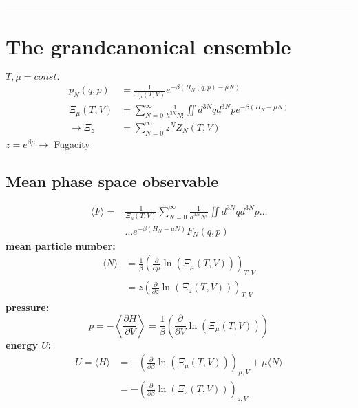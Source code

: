 \noindent\rule[1ex]{\textwidth/5}{1pt}
\section{The grandcanonical ensemble}

$T,\mu = const.$
\[
    \begin{aligned}
        p_N(q,p) &= \frac{1}{\Xi_\mu(T,V)} e^{-\beta (H_N(q,p) - \mu N)} \\
        \Xi_{\mu}(T,V) &= \sum_{N=0}^\infty \frac{1}{h^{3N}N!} \iint d^{3N} q d^{3N} p e^{-\beta (H_N - \mu N)} \\
        \rightarrow \Xi_z&= \sum_{N=0}^\infty z^N Z_N(T,V)
    \end{aligned}
\]
$z = e^{\beta \mu} \rightarrow $ Fugacity 


\subsection*{Mean phase space observable}

\[
    \begin{aligned}
        \langle F \rangle = &\frac{1}{\Xi_\mu(T,V)} \sum_{N=0}^\infty \frac{1}{h^{3N}N!} \iint d^{3N} q d^{3N} p  \dots \\
         &\dots e^{-\beta (H_N - \mu N)} F_N (q,p)
    \end{aligned}
\]
\textbf{mean particle number:}
\[
    \begin{aligned}
        \langle N \rangle &= \frac{1}{\beta} \left( \frac{\partial}{\partial \mu} \ln \left(\Xi_\mu ( T,V)\right)\right)_{T,V} \\
            &= z \left(\frac{\partial}{\partial z} \ln \left(\Xi_z(T,V)\right)\right)_{T,V}
    \end{aligned}
\]
\textbf{pressure:}
\[
    p = - \left\langle \frac{\partial H}{\partial V} \right\rangle = \frac{1}{\beta} \left( \frac{\partial}{\partial V} \ln \left(\Xi_\mu ( T,V)\right)\right)
\]
\textbf{energy $U$:}
\[
    \begin{aligned}
        U = \langle H \rangle &= - \left( \frac{\partial}{\partial \beta} \ln \left(\Xi_\mu ( T,V)\right)\right)_{\mu,V} + \mu \langle N \rangle \\
            &= - \left( \frac{\partial}{\partial \beta} \ln \left(\Xi_z ( T,V)\right)\right)_{z,V}
    \end{aligned}
\]

